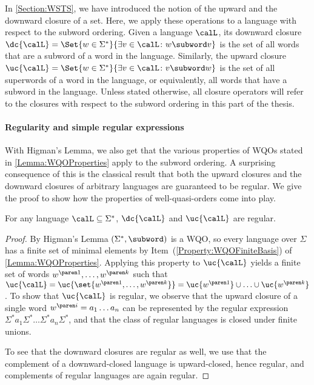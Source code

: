 \documentclass[../../diss.tex]{subfiles}
\begin{document}
In \cref{Section:WSTS}, we have introduced the notion of the upward and the downward closure of a set.
Here, we apply these operations to a language with respect to the subword ordering.
Given a language $\calL$, its downward closure
\(
    \dc{\calL} = \Set{ w \in \Sigma^*}{ \exists v \in \calL \colon w \subword v}
\)
is the set of all words that are a subword of a word in the language.
Similarly, the upward closure
\(
    \uc{\calL} = \Set{ w \in \Sigma^*}{ \exists v \in \calL \colon v \subword w}
\)
is the set of all superwords of a word in the language, or equivalently, all words that have a subword in the language.
Unless stated otherwise, all closure operators will refer to the closures with respect to the subword ordering in this part of the thesis.

\paragraph{Regularity and simple regular expressions}

With Higman's Lemma, we also get that the various properties of WQOs stated in \cref{Lemma:WQOProperties} apply to the subword ordering.
A surprising consequence of this is the classical result that both the upward closures and the downward closures of arbitrary languages are guaranteed to be regular.
We give the proof to show how the properties of well-quasi-orders come into play.

\begin{theorem}%
\label{Theorem:Haines}%
    For any language $\calL \subseteq \Sigma^*$, $\dc{\calL}$ and $\uc{\calL}$ are regular.
\end{theorem}

\begin{proof}
    By Higman's Lemma $(\Sigma^*,\subword)$ is a WQO, so every language over $\Sigma$ has a finite set of minimal elements by Item~(\ref{Property:WQOFiniteBasis}) of \cref{Lemma:WQOProperties}.
    Applying this property to $\uc{\calL}$ yields a finite set of words $\itr{w}{1}, \ldots, \itr{w}{k}$ such that $\uc{\calL} = \uc{\set{ \itr{w}{1}, \ldots, \itr{w}{k}}} = \uc{\itr{w}{1}} \cup \ldots \cup \uc{\itr{w}{k}}$.
%
    To show that $\uc{\calL}$ is regular, we observe that the upward closure of a single word $\itr{w}{i} = a_1 \ldots a_n$ can be represented by the regular expression $\Sigma^* a_1 \Sigma^* \ldots \Sigma^* a_n \Sigma^*$, and that the class of regular languages is closed under finite unions.

    To see that the downward closures are regular as well, we use that the complement of a downward-closed language is upward-closed, hence regular, and complements of regular languages are again regular.
\end{proof}
\end{document}
